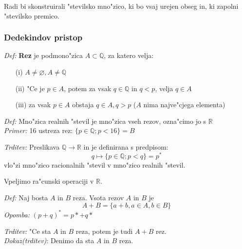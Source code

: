 Radi bi skonstruirali "stevilsko mno"zico, ki bo vsaj urejen obseg in, ki zapolni "stevilsko premico.

\subsubsection*{Dedekindov pristop}
\emph{Def:} \textbf{Rez} je podmono"zica \(A \subset \mathbb{Q}\), za katero velja:
\begin{enumerate}
	\item[(i)] \(A \neq \varnothing, A \neq \mathbb{Q}\)
	\item[(ii)] "Ce je \(p \in A\), potem za vsak \(q \in \mathbb{Q}\) in \(q < p\), velja \(q \in A\)
	\item[(iii)] za vsak \(p \in A\) obstaja \(q \in A, q > p\) (\(A\) nima najve"cjega elementa)
\end{enumerate}

\emph{Def:} Mno"zica realnih "stevil je mno"zica vseh rezov, ozna"cimo jo s \(\mathbb{R}\)\\
\emph{Primer:} 16 ustreza rez: \(\{p \in \mathbb{Q}; p < 16\} = B\)

\emph{Trditev:} Preslikava \(\mathbb{Q} \rightarrow \mathbb{R}\) in je definirana s predpisom:
\[q \mapsto \{p \in \mathbb{Q}; p < q\} = p^*\]
\hspace*{48pt}vlo"zi mno"zico racionalnih "stevil v mno"zico realnih "stevil.

Vpeljimo ra"cunski operaciji v \(\mathbb{R}\).

\emph{Def:} Naj bosta \(A\) in \(B\) reza. Vsota rezov \(A\) in \(B\) je
\[A + B = \{a + b, a \in A, b \in B\}\]
\hspace*{24pt}\emph{Opomba:} \((p + q)^* = p* + q*\)

\emph{Trditev:} "Ce sta \(A\) in \(B\) reza, potem je tudi \(A + B\) rez.\\
\emph{Dokaz(trditev)}: Denimo da sta \(A\) in \(B\) reza.

